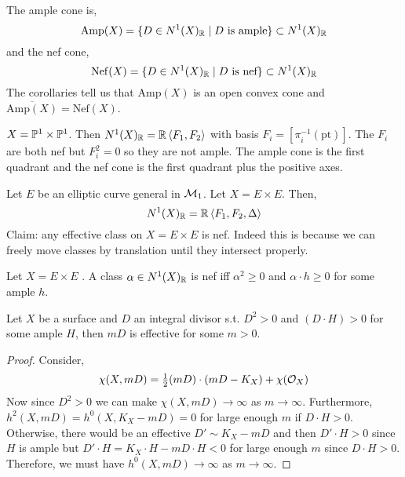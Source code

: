 \documentclass[12pt]{article}
\begin{document}
\newcommand{\Amp}{\mathrm{Amp}}
\newcommand{\Nef}{\mathrm{Nef}}

\begin{defn}
The ample cone is,
\[ \Amp(X) = \{ D \in N^1(X)_{\RR} \mid D \text{ is ample} \} \subset N^1(X)_{\RR} \]
and the nef cone,
\[ \Nef(X) = \{ D \in N^1(X)_{\RR} \mid D \text{ is nef} \} \subset N^1(X)_{\RR} \]
The corollaries tell us that $\Amp(X)$ is an open convex cone and $\overline{\Amp(X)} = \Nef(X)$.
\end{defn}

\begin{example}
$X = \P^1 \times \P^1$. Then $N^1(X)_{\RR} = \RR \left< F_1, F_2 \right>$ with basis $F_i = [\pi_i^{-1}(\text{pt})]$. The $F_i$ are both nef but $F_i^2 = 0$ so they are not ample. The ample cone is the first quadrant and the nef cone is the first quadrant plus the positive axes. 
\end{example}

\begin{example}
Let $E$ be an elliptic curve general in $\M_1$. Let $X = E \times E$. Then,
\[ N^1(X)_{\RR} = \RR \left< F_1, F_2, \Delta \right> \]
Claim: any effective class on $X = E \times E$ is nef. Indeed this is because we can freely move classes by translation until they intersect properly. 
\end{example}

\begin{lemma}
Let $X = E \times E$ . A class $\alpha \in N^1(X)_{\RR}$ is nef iff $\alpha^2 \ge 0$ and $\alpha \cdot h \ge 0$ for some ample $h$.
\end{lemma}

\begin{prop}
Let $X$ be a surface and $D$ an integral divisor s.t. $D^2 > 0$ and $(D \cdot H) > 0$ for some ample $H$, then $m D$ is effective for some $m > 0$. 
\end{prop}

\begin{proof}
Consider,
\[ \chi(X, mD) = \tfrac{1}{2} (m D) \cdot (mD - K_X) + \chi(\struct{X}) \]
Now since $D^2 > 0$ we can make $\chi(X, mD) \to \infty$ as $m \to \infty$. Furthermore, $h^2(X, mD) = h^0(X, K_X - mD) = 0$ for large enough $m$ if $D \cdot H > 0$. Otherwise, there would be an effective $D' \sim K_X - mD$ and then $D' \cdot H > 0$ since $H$ is ample but $D' \cdot H = K_X \cdot H - m D \cdot H < 0$ for large enough $m$ since $D \cdot H > 0$. Therefore, we must have $h^0(X, mD) \to \infty$ as $m \to \infty$.
\end{proof}
\end{document}

